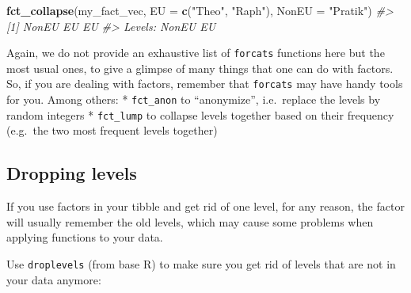 \documentclass[]{book}
\newenvironment{Shaded}{}{}
\newcommand{\CommentTok}[1]{\textcolor[rgb]{0.38,0.63,0.69}{\textit{#1}}}
\newcommand{\DataTypeTok}[1]{\textcolor[rgb]{0.56,0.13,0.00}{#1}}
\newcommand{\KeywordTok}[1]{\textcolor[rgb]{0.00,0.44,0.13}{\textbf{#1}}}
\newcommand{\NormalTok}[1]{#1}
\newcommand{\OperatorTok}[1]{\textcolor[rgb]{0.40,0.40,0.40}{#1}}
\newcommand{\StringTok}[1]{\textcolor[rgb]{0.25,0.44,0.63}{#1}}
\begin{document}
\begin{Shaded}
\begin{Highlighting}[]
\KeywordTok{fct_collapse}\NormalTok{(my_fact_vec, }\DataTypeTok{EU =} \KeywordTok{c}\NormalTok{(}\StringTok{"Theo"}\NormalTok{, }\StringTok{"Raph"}\NormalTok{), }\DataTypeTok{NonEU =} \StringTok{"Pratik"}\NormalTok{)}
\CommentTok{#> [1] NonEU EU    EU   }
\CommentTok{#> Levels: NonEU EU}
\end{Highlighting}
\end{Shaded}

Again, we do not provide an exhaustive list of \texttt{forcats} functions here but the most usual ones, to give a glimpse of many things that one can do with factors. So, if you are dealing with factors, remember that \texttt{forcats} may have handy tools for you. Among others:
* \texttt{fct\_anon} to ``anonymize'', i.e.~replace the levels by random integers
* \texttt{fct\_lump} to collapse levels together based on their frequency (e.g.~the two most frequent levels together)

\hypertarget{dropping-levels}{%
\subsection{Dropping levels}\label{dropping-levels}}

If you use factors in your tibble and get rid of one level, for any reason, the factor will usually remember the old levels, which may cause some problems when applying functions to your data.

\begin{Shaded}
\end{Shaded}

Use \texttt{droplevels} (from base R) to make sure you get rid of levels that are not in your data anymore:

\begin{Shaded}
\end{Shaded}
\end{document}
